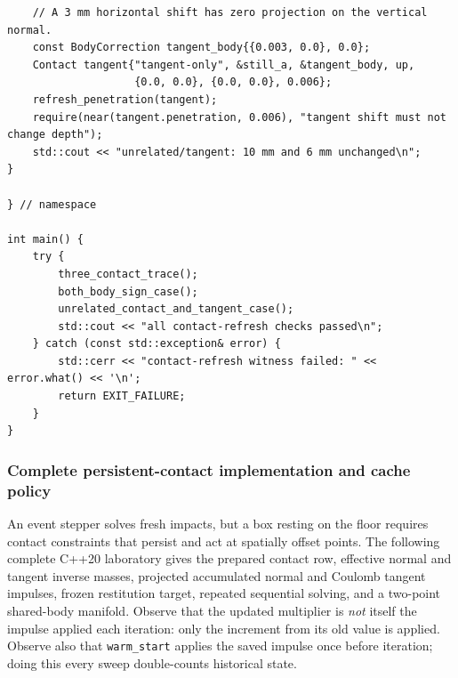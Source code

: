 \begin{verbatim}
    // A 3 mm horizontal shift has zero projection on the vertical normal.
    const BodyCorrection tangent_body{{0.003, 0.0}, 0.0};
    Contact tangent{"tangent-only", &still_a, &tangent_body, up,
                    {0.0, 0.0}, {0.0, 0.0}, 0.006};
    refresh_penetration(tangent);
    require(near(tangent.penetration, 0.006), "tangent shift must not change depth");
    std::cout << "unrelated/tangent: 10 mm and 6 mm unchanged\n";
}

} // namespace

int main() {
    try {
        three_contact_trace();
        both_body_sign_case();
        unrelated_contact_and_tangent_case();
        std::cout << "all contact-refresh checks passed\n";
    } catch (const std::exception& error) {
        std::cerr << "contact-refresh witness failed: " << error.what() << '\n';
        return EXIT_FAILURE;
    }
}
\end{verbatim}

\subsubsection{Complete persistent-contact implementation and cache policy}\label{06-engine-ii-ch046-complete-persistent-contact-implementation-and-cache-policy}

An event stepper solves fresh impacts, but a box resting on the floor requires contact constraints that persist and act at spatially offset points. The following complete C++20 laboratory gives the prepared contact row, effective normal and tangent inverse masses, projected accumulated normal and Coulomb tangent impulses, frozen restitution target, repeated sequential solving, and a two-point shared-body manifold. Observe that the updated multiplier is \emph{not} itself the impulse applied each iteration: only the increment from its old value is applied. Observe also that \texttt{warm\_start} applies the saved impulse once before iteration; doing this every sweep double-counts historical state.

